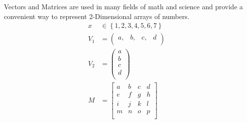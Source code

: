 		Vectors and Matrices are used in many fields of math and science and provide a convenient way to represent 2-Dimensional arrays of numbers.
		\begin{align}
			x&\in{}\left\{1,2,3,4,5,6,7\right\}\\
			V_{1} &= {\left(
			\begin{array}{cccc}
				a, & b, & c, & d\\
			\end{array}
			\right)}\\
			V_{2} &= \left(
			\begin{array}{c}
				a \\
				b \\
				c \\
				d \\
			\end{array}
			\right)\\
			M &= {\left[
			\begin{array}{cccc}
				a & b & c & d\\
				e & f & g & h\\
				i & j & k & l\\
				m & n & o & p\\
			\end{array}
			\right]}
		\end{align}